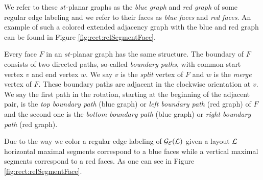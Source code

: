     We refer to these $st$-planar graphs as the \emph{blue graph} and \emph{red graph} of some regular edge labeling and we refer to their faces as \emph{blue faces} and \emph{red faces}. An example of such a colored extended adjacency graph with the blue and red graph can be found in Figure \ref{fig:rect:relSegmentFace}.

    Every face $F$ in an $st$-planar graph has the same structure. The boundary of $F$ consists of two directed paths, so-called \emph{boundary paths}, with common start vertex $v$ and end vertex $w$. We say $v$ is the \emph{split} vertex of $F$ and $w$ is the \emph{merge} vertex of $F$.
    These boundary paths are adjacent in the clockwise orientation at $v$. We say the first path in the rotation, starting at the beginning of the adjacent pair, is the \emph{top boundary path} (blue graph) or \emph{left boundary path} (red graph) of $F$ and the second one is the \emph{bottom boundary path} (blue graph) or \emph{right boundary path} (red graph).


    Due to the way we color a regular edge labeling of $\mathcal{G}_{\mathcal{E}}(\mathcal{L})$ given a layout $\mathcal{L}$ horizontal maximal segments correspond to a blue faces while a vertical maximal segments correspond to a red faces. As one can see in Figure \ref{fig:rect:relSegmentFace}.

